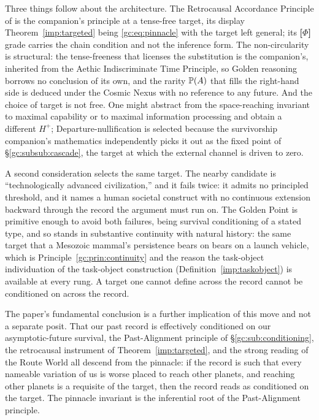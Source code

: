 Three things follow about the architecture. The Retrocausal Accordance
Principle of \cite{GoldenTargeted} is the companion's principle
at a tense-free target, its display Theorem~\ref{imp:targeted} being
\eqref{gc:eq:pinnacle} with the target left general; its
\textbf{[$\Phi$]} grade carries the chain condition and not the
inference form. The non-circularity is structural: the tense-freeness
that licenses the substitution is the companion's, inherited from the
Aethic Indiscriminate Time Principle, so Golden reasoning borrows no
conclusion of its own, and the rarity $\mathbb{P}(A)$ that fills the
right-hand side is deduced under the Cosmic Nexus with no reference to
any future. And the choice of target is not free. One might abstract
from the space-reaching invariant to maximal capability or to maximal
information processing and obtain a different $H^{+}$;
Departure-nullification is selected because the survivorship
companion's mathematics \cite{GoldenSurvivorship} independently picks it out as the fixed point
of \S\ref{gc:subsub:cascade}, the target at which the external channel
is driven to zero.

A second consideration selects the same target. The nearby candidate
is ``technologically advanced civilization,'' and it fails twice: it
admits no principled threshold, and it names a human societal
construct with no continuous extension backward through the record
the argument must run on. The Golden Point is primitive enough to
avoid both failures, being survival conditioning of a stated type, and
so stands in substantive continuity with natural history: the same
target that a Mesozoic mammal's persistence bears on bears on a launch
vehicle, which is Principle~\ref{gc:prin:continuity} and the reason
the task-object individuation of the task-object construction (Definition~\ref{imp:taskobject}) is available at every
rung. A target one cannot define across the record cannot be
conditioned on across the record.

The paper's fundamental conclusion is a further implication of this
move and not a separate posit. That our past record is effectively
conditioned on our asymptotic-future survival, the Past-Alignment
principle of \S\ref{gc:sub:conditioning}, the retrocausal instrument
of Theorem~\ref{imp:targeted}, and the strong reading of the
Route World all descend from the pinnacle: if the record is such that
every nameable variation of us is worse placed to reach other planets,
and reaching other planets is a requisite of the target, then the
record reads as conditioned on the target. The pinnacle invariant is
the inferential root of the Past-Alignment principle.


